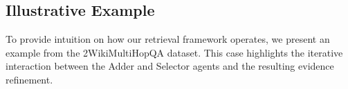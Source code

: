 \documentclass{article} %
\begin{document}



\subsection{Illustrative Example}
\label{app:illustrative_example}
To provide intuition on how our retrieval framework operates, we present an example from the 2WikiMultiHopQA dataset.  
This case highlights the iterative interaction between the Adder and Selector agents and the resulting evidence refinement.
\end{document}
